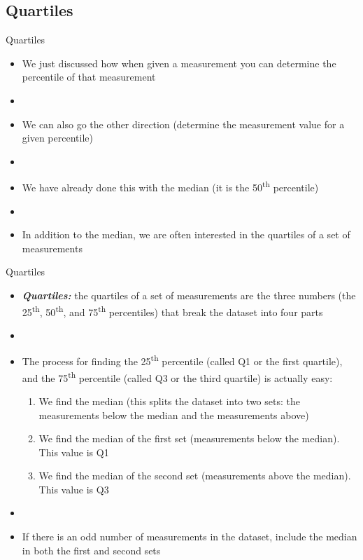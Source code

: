 \documentclass[xcolor=dvipsnames]{beamer}
\begin{document}
\subsection{Quartiles}
\begin{frame}{Quartiles}
	\begin{itemize}
		\item We just discussed how when given a measurement you can determine the percentile of that measurement \pause
		\item[]
		\item We can also go the other direction (determine the measurement value for a given percentile) \pause
		\item[]
		\item We have already done this with the median (it is the 50\textsuperscript{th} percentile) \pause
		\item[]
		\item In addition to the median, we are often interested in the quartiles of a set of measurements		
	\end{itemize}
\end{frame}

\begin{frame}{Quartiles}
	\begin{itemize}
		\item \textbf{\emph{Quartiles:}} the quartiles of a set of measurements are the three numbers (the 25\textsuperscript{th}, 50\textsuperscript{th}, and 75\textsuperscript{th} percentiles) that break the dataset into four parts \pause
			\item[]
		\item The process for finding the 25\textsuperscript{th} percentile (called Q1 or the first quartile), and the 75\textsuperscript{th} percentile (called Q3 or the third quartile) is actually easy: \pause
			\begin{enumerate}
			\item We find the median (this splits the dataset into two sets: the measurements below the median and the measurements above) \pause
			\item We find the median of the first set (measurements below the median). This value is Q1 \pause
			\item We find the median of the second set (measurements above the median). This value is Q3 \pause
		\end{enumerate}
	\item[]
	\item If there is an odd number of measurements in the dataset, include the median in both the first and second sets
	\end{itemize}
\end{frame}
\end{document}
